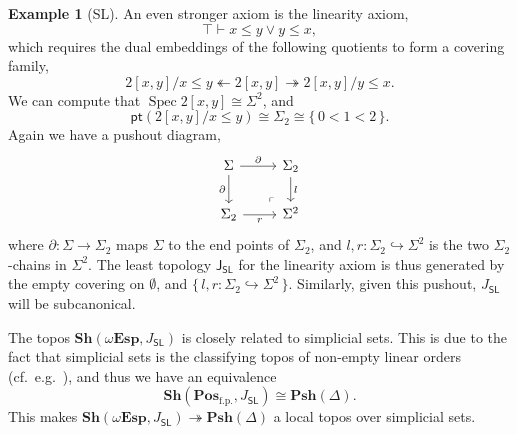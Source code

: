 \documentclass[12pt]{amsart}
\theoremstyle{definition}
\newtheorem{example}[theorem]{Example}
\newcommand{\mb}[1]{\mathbf{#1}}
\newcommand{\mr}[1]{\mathrm{#1}}
\newcommand{\ms}[1]{\mathsf{#1}}
\newcommand{\Pos}{\mb{Pos}}
\newcommand{\sh}{\mb{Sh}}
\newcommand{\psh}{\mb{Psh}}
\newcommand{\set}[1]{\{\,#1\,\}}
\newcommand{\surj}{\twoheadrightarrow}
\newcommand{\hook}{\hookrightarrow}
\newcommand{\fp}{_{\mr{f.p.}}}
\newcommand{\emp}{\emptyset}
\newcommand{\pt}{\ms{pt}}
\newcommand{\wTop}{\omega\mb{Esp}}
\newcommand{\spec}{\operatorname{Spec}}
\begin{document}
\begin{example}[SL]
  An even stronger axiom is the linearity axiom, 
  \[ \top \vdash x \le y \vee y \le x, \]
  which requires the dual embeddings of the following quotients to form a covering family,
  \[ 2[x,y]/x \le y \twoheadleftarrow 2[x,y] \surj 2[x,y]/y \le x. \]
  We can compute that $\spec 2[x,y] \cong \Sigma^2$, and 
  \[ \pt(2[x,y]/x \le y) \cong \Sigma_2 \cong \set{0 < 1 < 2}. \]
  Again we have a pushout diagram,
  \[
  \begin{tikzcd}
    \Sigma \ar[r, "\partial"] \ar[d, "\partial"'] & \Sigma_2 \ar[d, "l"] \\ 
    \Sigma_2 \ar[r, "r"'] & \Sigma^2
    \arrow["\lrcorner"{anchor=center, pos=0.125, rotate=180}, draw=none, from=2-2, to=1-1]
  \end{tikzcd}
  \]
  where $\partial : \Sigma \to \Sigma_2$ maps $\Sigma$ to the end points of $\Sigma_2$, and $l,r : \Sigma_2 \hook \Sigma^2$ is the two $\Sigma_2$-chains in $\Sigma^2$. The least topology $\ms J_{\ms{SL}}$ for the linearity axiom is thus generated by the empty covering on $\emp$, and $\set{l,r : \Sigma_2 \hook \Sigma^2}$. Similarly, given this pushout, $J_{\ms{SL}}$ will be subcanonical.

  The topos $\sh(\wTop,J_{\ms{SL}})$ is closely related to simplicial sets. This is due to the fact that simplicial sets is the classifying topos of non-empty linear orders (cf.\ e.g.~\cite[VIII. 8]{maclane1992sheaves}), and thus we have an equivalence 
  \[ \sh(\Pos\fp,J_{\ms{SL}}) \cong \psh(\Delta). \]
  This makes $\sh(\wTop,J_{\ms{SL}}) \surj \psh(\Delta)$ a local topos over simplicial sets.
\end{example}
\end{document}
